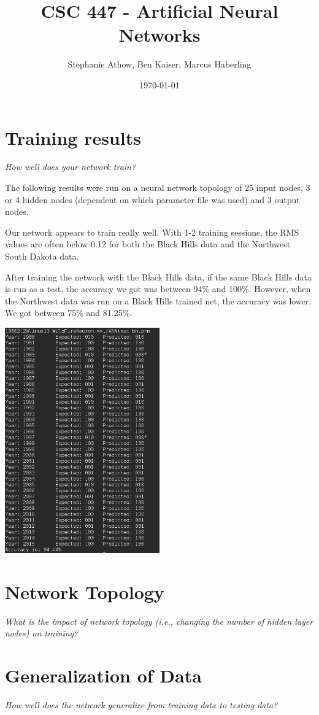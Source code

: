 \documentclass[•]{article}
\title{ CSC 447 - Artificial Neural Networks }
\author{Stephanie Athow, Ben Kaiser, Marcus Haberling}
\date{ \today }
\begin{document}
\maketitle

\section{Training results}
\textit{How well does your network train? }

The following results were run on a neural network topology of 25 input nodes, 3 or 4 hidden nodes (dependent on which parameter file was used) and 3 output nodes.

Our network appears to train really well. With 1-2 training sessions, the RMS values are often below 0.12 for both the Black Hills data and the Northwest South Dakota data.

After training the network with the Black Hills data, if the same Black Hills data is run as a test, the accuracy we got was between 94\% and 100\%. However, when the Northwest data was run on a Black Hills trained net, the accuracy was lower. We got between 75\% and 81.25\%. 

\begin{center}
\includegraphics[width=0.5\textwidth]{pictures/Test1BHtrainBHtest.png}
\end{center}

\section{Network Topology}
\textit{What is the impact of network topology (i.e., changing the number of hidden layer nodes) on training? }

\section{Generalization of Data}
\textit{How well does the network generalize from training data to testing data?}
\end{document}
